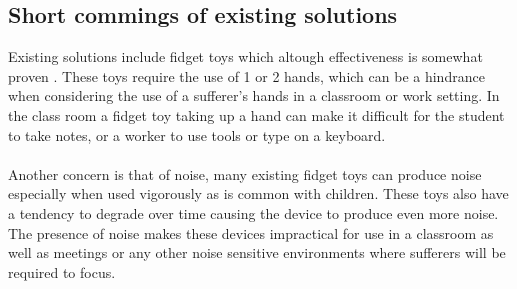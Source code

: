     \subsection{Short commings of existing solutions}
      Existing solutions include fidget toys which altough effectiveness is
      somewhat proven \cite{amanda}. These toys require the use of 1 or 2 
      hands, which can be a hindrance when considering the use of a sufferer's
      hands in a classroom or work setting. In the class room a fidget toy
      taking up a hand can make it difficult for the student to take notes, or
      a worker to use tools or type on a keyboard. \\ \\
      Another concern is that of noise, many existing fidget toys can produce
      noise especially when used vigorously as is common with children.
      These toys also have a tendency to degrade over time causing the device to
      produce even more noise. The presence of noise makes these devices
      impractical for use in a classroom as well as meetings or any other noise
      sensitive environments where sufferers will be required to focus.


